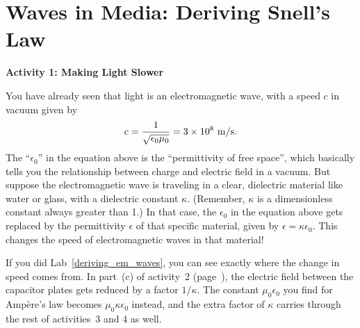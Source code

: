 \section{Waves in Media: Deriving Snell's Law}


\makelabheader %

\bigskip
\textbf{Activity 1: Making Light Slower}

You have already seen that light is an electromagnetic wave, with a speed $c$ in vacuum given by
$$c = \frac{1}{\sqrt{\epsilon_0 \mu_0}}=3 \times 10^{8}~{\rm m/s}.$$
The ``$\epsilon_0$'' in the equation above is the ``permittivity of free space'', which basically tells you the relationship between charge and electric field in a vacuum.  But suppose the electromagnetic wave is traveling in a clear, dielectric material like water or glass, with a dielectric constant $\kappa$.  (Remember, $\kappa$ is a dimensionless constant always greater than 1.)  In that case, the $\epsilon_0$ in the equation above gets replaced by the permittivity $\epsilon$ of that specific material, given by $\epsilon = \kappa\epsilon_0$.  This changes the speed of electromagnetic waves in that material!

{If you did Lab~\ref{deriving_em_waves}, you can see exactly where the change in speed comes from.  In part~(c) of activity~2 (page~\pageref{part_ampere_field_between_plates}), the electric field between the capacitor plates gets reduced by a factor $1/\kappa$.  The constant $\mu_0\epsilon_0$ you find for Amp\`ere's law becomes $\mu_0\kappa\epsilon_0$ instead, and the extra factor of $\kappa$ carries through the rest of activities~3 and 4 as well.}
{}

